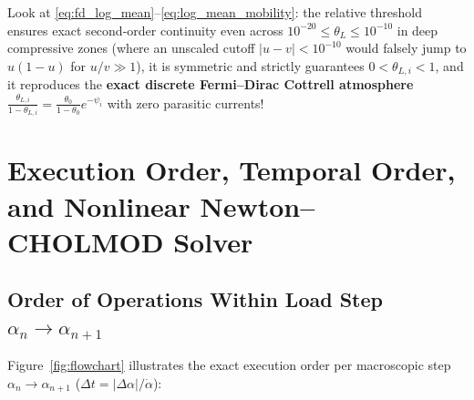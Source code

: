 \documentclass[11pt,a4paper]{article}
\begin{document}
Look at \eqref{eq:fd_log_mean}--\eqref{eq:log_mean_mobility}: the relative threshold ensures exact second-order continuity even across $10^{-20} \le \theta_L \le 10^{-10}$ in deep compressive zones (where an unscaled cutoff $|u-v| < 10^{-10}$ would falsely jump to $u(1-u)$ for $u/v \gg 1$), it is symmetric and strictly guarantees $0 < \theta_{L,i} < 1$, and it reproduces the \textbf{exact discrete Fermi--Dirac Cottrell atmosphere} $\frac{\theta_{L,i}}{1-\theta_{L,i}} = \frac{\theta_0}{1-\theta_0}e^{-\psi_i}$ with zero parasitic currents!

\section{Execution Order, Temporal Order, and Nonlinear Newton--CHOLMOD Solver}
\label{sec:temporal_order}

\subsection{Order of Operations Within Load Step \texorpdfstring{$\alpha_n \to \alpha_{n+1}$}{alpha\_n to alpha\_(n+1)}}

Figure~\ref{fig:flowchart} illustrates the exact execution order per macroscopic step $\alpha_n \to \alpha_{n+1}$ ($\Delta t = |\Delta\alpha|/\dot{\alpha}$):
\end{document}

